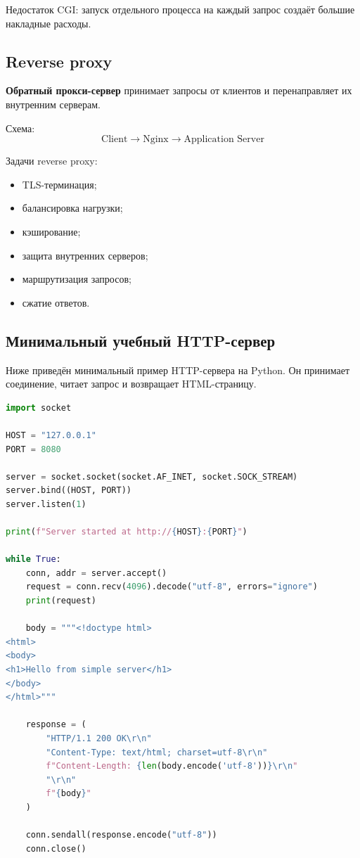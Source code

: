 \documentclass[12pt,a4paper]{article}
\begin{document}
Недостаток CGI: запуск отдельного процесса на каждый запрос создаёт большие накладные расходы.

\subsection{Reverse proxy}

\textbf{Обратный прокси-сервер} принимает запросы от клиентов и перенаправляет их внутренним серверам.

Схема:
\[
\text{Client} \rightarrow \text{Nginx} \rightarrow \text{Application Server}
\]

Задачи reverse proxy:
\begin{itemize}
    \item TLS-терминация;
    \item балансировка нагрузки;
    \item кэширование;
    \item защита внутренних серверов;
    \item маршрутизация запросов;
    \item сжатие ответов.
\end{itemize}

\subsection{Минимальный учебный HTTP-сервер}

Ниже приведён минимальный пример HTTP-сервера на Python. Он принимает соединение, читает запрос и возвращает HTML-страницу.

\begin{lstlisting}[language=Python]
import socket

HOST = "127.0.0.1"
PORT = 8080

server = socket.socket(socket.AF_INET, socket.SOCK_STREAM)
server.bind((HOST, PORT))
server.listen(1)

print(f"Server started at http://{HOST}:{PORT}")

while True:
    conn, addr = server.accept()
    request = conn.recv(4096).decode("utf-8", errors="ignore")
    print(request)

    body = """<!doctype html>
<html>
<body>
<h1>Hello from simple server</h1>
</body>
</html>"""

    response = (
        "HTTP/1.1 200 OK\r\n"
        "Content-Type: text/html; charset=utf-8\r\n"
        f"Content-Length: {len(body.encode('utf-8'))}\r\n"
        "\r\n"
        f"{body}"
    )

    conn.sendall(response.encode("utf-8"))
    conn.close()
\end{lstlisting}
\end{document}
